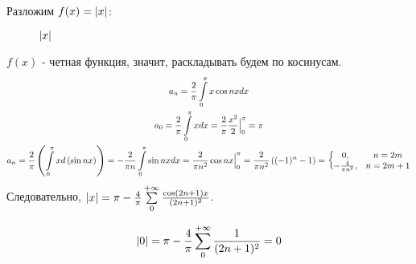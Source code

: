 \newpage

Разложим $f(x) = \left|x\right|$:

\begin{figure}[h]
\centering
{}
	\caption{$\left|x\right|$}	
\end{figure}

$f(x)$ - четная функция, значит, раскладывать будем по косинусам.
\begin{gather*}
	a_n = \frac{2}{\pi} \int\limits_{0}^{\pi} x\cos nx dx \\
	a_0 = \frac{2}{\pi} \int\limits_{0}^{\pi}x dx = \frac{2}{\pi} \frac{x^2}{2}\Big|_{0}^{\pi} = \pi \\
	a_n = \frac{2}{\pi}\left( \int\limits_{0}^{\pi} x d\left(\sin nx \right)\right) = 
	-\frac{2}{\pi n} \int\limits_{0}^{\pi} \sin nx dx = \frac{2}{\pi n^2}\cos nx \Big|_{0}^{\pi} = 
	\frac{2}{\pi n^2}\left((-1)^n - 1\right) = 
	\left\{\begin{matrix}
		0, & n = 2m \\
		-\frac{4}{\pi n^2}, & n = 2m + 1
	\end{matrix}\right.
\end{gather*}
Следовательно, $\left|x\right| = \pi - \frac{4}{\pi}\sum\limits_{0}^{+\infty}\frac{\cos (2n + 1)x}{(2n + 1)^2}$.


\begin{gather*}
	\left|0\right| = \pi - \frac{4}{\pi} \sum\limits_{0}^{+\infty}\frac{1}{(2n + 1)^2} = 0
\end{gather*}
